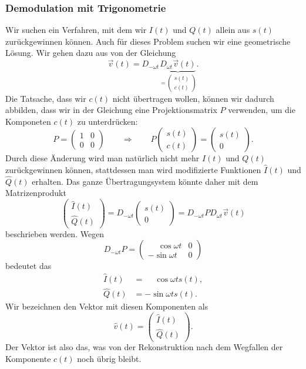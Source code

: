\subsubsection{Demodulation mit Trigonometrie}
Wir suchen ein Verfahren, mit dem wir $I(t)$ und $Q(t)$ allein aus
$s(t)$ zurückgewinnen können.
Auch für dieses Problem suchen wir eine geometrische Lösung.
Wir gehen dazu aus von der Gleichung
\[
\vec{v}(t)
=
D_{-\omega t}\underbrace{D_{\omega t}
\vec{v}(t)}_{=\begin{pmatrix}s(t)\\c(t)\end{pmatrix}}.
\]
Die Tatsache, dass wir $c(t)$ nicht übertragen wollen, können wir dadurch
abbilden, dass wir in der Gleichung eine Projektionsmatrix $P$
verwenden, um die Komponeten $c(t)$ zu unterdrücken:
\[
P=\begin{pmatrix}1&0\\0&0\end{pmatrix}
\qquad\Rightarrow\qquad
P\begin{pmatrix}s(t)\\c(t)\end{pmatrix}
=
\begin{pmatrix}s(t)\\0\end{pmatrix}.
\]
Durch diese Änderung wird man natürlich nicht mehr $I(t)$ und $Q(t)$ 
zurückgewinnen können, stattdessen man wird modifizierte Funktionen
$\hat{I}(t)$ und $\hat{Q}(t)$ erhalten.
Das ganze Übertragung\-system könnte daher mit dem Matrizenprodukt
\[
\begin{pmatrix}
\hat{I}(t)\\
\hat{Q}(t)
\end{pmatrix}
=
D_{-\omega t} \begin{pmatrix}s(t)\\0\end{pmatrix}
=
D_{-\omega t} P D_{\omega t}\vec{v}(t)
\]
beschrieben werden.
Wegen
\[
D_{-\omega t}P
=
\begin{pmatrix}
\phantom{-}\cos\omega t & 0 \\
         - \sin\omega t & 0
\end{pmatrix}
\]
bedeutet das
\begin{align*}
\hat{I}(t) &= \phantom{-}\cos\omega t s(t),\\
\hat{Q}(t) &= -\sin\omega t s(t).
\end{align*}
Wir bezeichnen den Vektor mit diesen Komponenten als
\[
\hat{v}(t) = \begin{pmatrix}\hat{I}(t)\\\hat{Q}(t)\end{pmatrix}.
\]
Der Vektor ist also das, was von der Rekonstruktion nach dem Wegfallen
der Komponente $c(t)$ noch übrig bleibt.

